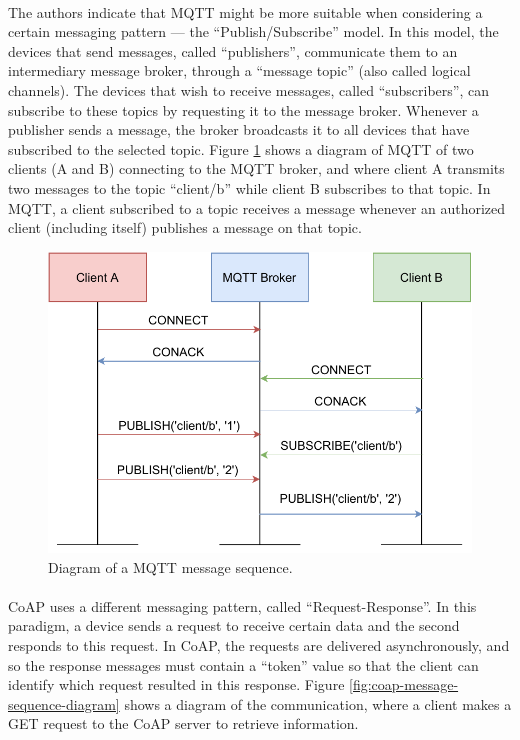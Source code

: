 \paragraph{} The authors indicate that \acs{MQTT} might be more suitable when considering a certain messaging pattern — the ``Publish/Subscribe'' model. In this model, the devices that send messages, called ``publishers'', communicate them to an intermediary message broker, through a ``message topic'' (also called logical channels). The devices that wish to receive messages, called ``subscribers'', can subscribe to these topics by requesting it to the message broker. Whenever a publisher sends a message, the broker broadcasts it to all devices that have subscribed to the selected topic.  Figure \ref{fig:mqtt-message-sequence-diagram} shows a diagram of \acs{MQTT} of two clients (A and B) connecting to the \acs{MQTT} broker, and where client A transmits two messages to the topic ``client/b'' while client B subscribes to that topic. In \acs{MQTT}, a client subscribed to a topic receives a message whenever an authorized client (including itself) publishes a message on that topic.

\begin{figure}[H]
    \centering
    \includegraphics[width=0.63\linewidth]{images/mqtt message sequence diagram.pdf}
    \caption[Diagram of a \acs{MQTT} message sequence.]{ Diagram of a \acs{MQTT} message sequence.}
    \label{fig:mqtt-message-sequence-diagram}
\end{figure}

\paragraph{} \acs{CoAP} uses a different messaging pattern, called ``Request-Response''. In this paradigm, a device sends a request to receive certain data and the second responds to this request. In \acs{CoAP}, the requests are delivered asynchronously, and so the response messages must contain a ``token'' value so that the client can identify which request resulted in this response. Figure \ref{fig:coap-message-sequence-diagram} shows a diagram of the communication, where a client makes a GET request to the \acs{CoAP} server to retrieve information. 


